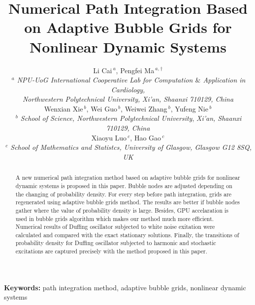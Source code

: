 \documentclass[a4paper, 11pt, final]{article}
\begin{document}
\title
{Numerical Path Integration Based on Adaptive Bubble Grids
 for Nonlinear Dynamic Systems
  }

\author{{Li Cai$^{\ a}$, Pengfei Ma$^{\ a,}$$^{\dag}$ }\\
{\small \it $^{\ a}$ NPU-UoG International Cooperative Lab for Computation ${\&}$ Application in Cardiology,}\\
{\small \it Northwestern Polytechnical University, }{\small \it Xi'an, Shaanxi 710129, China}\\
{Wenxian Xie$^{\ b}$, Wei Guo$^{\ b}$, Weiwei Zhang$^{\ b}$, {Yufeng Nie$^{\ b}$}}\\
{\small \it $^{\ b}$ School of Science, Northwestern Polytechnical University},
{\small \it Xi'an, Shaanxi 710129, China}\\
{Xiaoyu Luo$^{\ c}$, Hao Gao$^{\ c}$}\\
{\small \it $^{\ c}$ School of Mathematics and Statistcs, University of Glasgow, Glasgow G12 8SQ, UK}
}
\date{}
\maketitle
\pagestyle{myheadings} 
\begin{abstract}
    A new numerical path integration method based on adaptive bubble grids
   for nonlinear dynamic systems is proposed in this paper. 
   Bubble nodes are adjusted depending on the changing of probability density.
   For every step before path integration, grids are regenerated using adaptive bubble
   grids method. The results are better if bubble nodes gather where the
   value of probability density is large.
   Besides, GPU accelaration is used in bubble grids algorithm which makes our 
   method much more efficient. Numerical results of Duffing
   oscillator subjected to white noise exitation were calculated and compared with
   the exact stationary solutions. Finally, the transitions of probability density
   for Duffing oscillator subjected to harmonic and stochastic excitations are
   captured precisely with the method proposed in this paper.

\end{abstract}
{\bf Keywords:}\quad\/ 
path integration method, adaptive bubble grids, nonlinear dynamic systems
\maketitle
\end{document}
